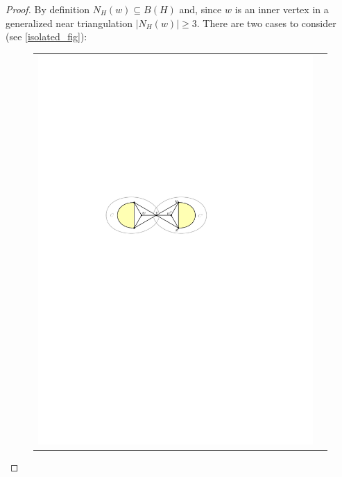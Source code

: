 \documentclass{article}
\theoremstyle{definition}
\begin{document}
\begin{proof}
  By definition $N_H(w)\subseteq B(H)$ and, since $w$ is an inner vertex in a generalized near triangulation $|N_H(w)|\ge 3$. There are two cases to consider (see \cref{isolated_fig}):
  \begin{figure}[htpb]
    \centering
    \begin{tabular}{cc}
      \includegraphics[page=1]{figs/isolated} &

\end{tabular}
\end{figure}
\end{proof}
\end{document}
